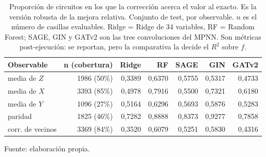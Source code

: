 \begin{table}[htbp]
    \centering
    {\footnotesize
    \begin{tabular}{@{}lrrrrrr@{}}
        \toprule
        \textbf{Observable} & \textbf{n (cobertura)} & \textbf{Ridge} & \textbf{RF} & \textbf{SAGE} & \textbf{GIN} & \textbf{GATv2} \\
        \midrule
        media de $Z$ & 1986 (50\%) & 0,3389 & 0,6370 & 0,5755 & 0,5317 & 0,4733 \\
        media de $X$ & 3393 (85\%) & 0,4978 & 0,7916 & 0,5500 & 0,7321 & 0,6180 \\
        media de $Y$ & 1096 (27\%) & 0,5164 & 0,6296 & 0,5693 & 0,5876 & 0,5283 \\
        paridad & 1825 (46\%) & 0,7282 & 0,8888 & 0,8373 & 0,9277 & 0,7858 \\
        corr. de vecinos & 3369 (84\%) & 0,3520 & 0,6079 & 0,5251 & 0,5830 & 0,4316 \\
        \bottomrule
    \end{tabular}}

    \caption{Proporción de circuitos en los que la corrección acerca el valor al exacto. Es la versión robusta de la mejora relativa. Conjunto de test, por observable. $n$ es el número de casillas evaluables. Ridge = Ridge de 34 variables, RF = Random Forest; SAGE, GIN y GATv2 son las tres convoluciones del MPNN.  Son métricas post-ejecución: se reportan, pero la comparativa la decide el $R^2$ sobre $f$.}
    \label{tab:mitigacion_fraccion}

    {\footnotesize Fuente: elaboración propia.}
\end{table}
